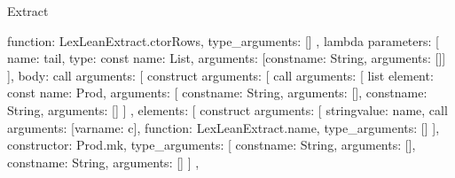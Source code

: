 \begin{lexlean}{Extract}
\begin{toolingmodule}
{{{{{{{{{{{{                                    function: LexLeanExtract.ctorRows,
                                    type_arguments: []
                                  },
                                  lambda{
                                    parameters: [
                                      {
                                        name: tail,
                                        type: const{
                                          name: List,
                                          arguments: [const{name: String, arguments: []}]
                                        }
                                      }
                                    ],
                                    body: call{
                                      arguments: [
                                        construct{
                                          arguments: [
                                            call{
                                              arguments: [
                                                list{
                                                  element: const{
                                                    name: Prod,
                                                    arguments: [
                                                      const{name: String, arguments: []},
                                                      const{name: String, arguments: []}
                                                    ]
                                                  },
                                                  elements: [
                                                    construct{
                                                      arguments: [
                                                        string{value: name},
                                                        call{
                                                          arguments: [var{name: c}],
                                                          function: LexLeanExtract.name,
                                                          type_arguments: []
                                                        }
                                                      ],
                                                      constructor: Prod.mk,
                                                      type_arguments: [
                                                        const{name: String, arguments: []},
                                                        const{name: String, arguments: []}
                                                      ]
                                                    },
}}}}}}}}}}}}}}}}
\end{toolingmodule}
\end{lexlean}
